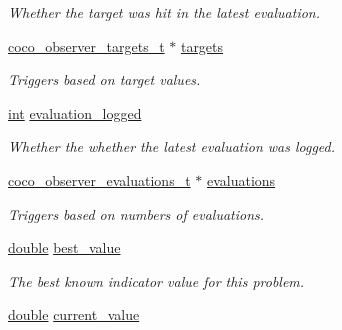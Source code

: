 \begin{DoxyCompactItemize}
\begin{DoxyCompactList}\small\item\em Whether the target was hit in the latest evaluation. \end{DoxyCompactList}\item 
\hyperlink{structcoco__observer__targets__t}{coco\+\_\+observer\+\_\+targets\+\_\+t} $\ast$ \hyperlink{structlogger__biobj__indicator__t_afc5d24e6900fcfa84bb1d680c7956e98}{targets}\hypertarget{structlogger__biobj__indicator__t_afc5d24e6900fcfa84bb1d680c7956e98}{}\label{structlogger__biobj__indicator__t_afc5d24e6900fcfa84bb1d680c7956e98}

\begin{DoxyCompactList}\small\item\em Triggers based on target values. \end{DoxyCompactList}\item 
\hyperlink{classint}{int} \hyperlink{structlogger__biobj__indicator__t_ad2b415dd1ca5e90f79b497a3e889bd37}{evaluation\+\_\+logged}\hypertarget{structlogger__biobj__indicator__t_ad2b415dd1ca5e90f79b497a3e889bd37}{}\label{structlogger__biobj__indicator__t_ad2b415dd1ca5e90f79b497a3e889bd37}

\begin{DoxyCompactList}\small\item\em Whether the whether the latest evaluation was logged. \end{DoxyCompactList}\item 
\hyperlink{structcoco__observer__evaluations__t}{coco\+\_\+observer\+\_\+evaluations\+\_\+t} $\ast$ \hyperlink{structlogger__biobj__indicator__t_a970cebe0fd05d8da21e8f1c7134b11e1}{evaluations}\hypertarget{structlogger__biobj__indicator__t_a970cebe0fd05d8da21e8f1c7134b11e1}{}\label{structlogger__biobj__indicator__t_a970cebe0fd05d8da21e8f1c7134b11e1}

\begin{DoxyCompactList}\small\item\em Triggers based on numbers of evaluations. \end{DoxyCompactList}\item 
\hyperlink{classdouble}{double} \hyperlink{structlogger__biobj__indicator__t_af665c4dadc752c19512464deb88505a3}{best\+\_\+value}\hypertarget{structlogger__biobj__indicator__t_af665c4dadc752c19512464deb88505a3}{}\label{structlogger__biobj__indicator__t_af665c4dadc752c19512464deb88505a3}

\begin{DoxyCompactList}\small\item\em The best known indicator value for this problem. \end{DoxyCompactList}\item 
\hyperlink{classdouble}{double} \hyperlink{structlogger__biobj__indicator__t_a2d007526a9258d443864bddc74e6248c}{current\+\_\+value}\hypertarget{structlogger__biobj__indicator__t_a2d007526a9258d443864bddc74e6248c}{}\label{structlogger__biobj__indicator__t_a2d007526a9258d443864bddc74e6248c}


\end{DoxyCompactItemize}
